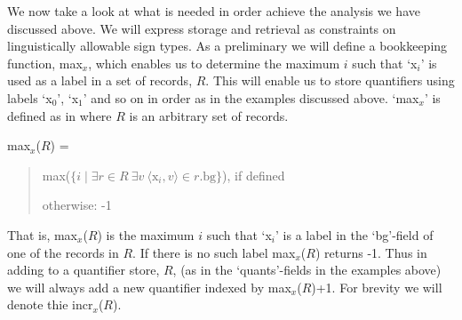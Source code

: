 We now take a look at what is needed in order achieve the analysis we
have discussed above.  We will express storage and retrieval as
constraints on linguistically allowable sign types.  As a preliminary
we will define a bookkeeping function, max$_x$, which enables us to determine
the maximum $i$ such that `x$_i$' is used as a label in a set of
records, $R$.  This will enable us to store quantifiers using labels
`x$_0$', `x$_1$' and so on in order as in the examples discussed
above. `max$_x$' is defined as in \nexteg{} where $R$ is an arbitrary
set of records.
\begin{ex} 
max$_x$($R$) = 
\begin{quote}
max($\{i\mid\exists r\in R\ \exists v\ \langle \mathrm{x}_i,v\rangle\in r.\mathrm{bg}\}$), if
defined

otherwise: -1 
\end{quote}
\end{ex}
That is, max$_x$($R$) is the maximum $i$ such that `x$_i$' is a label
in the `bg'-field of one of the records in $R$.  If there is no such label max$_x$($R$)
returns -1. Thus in adding to a quantifier store, $R$, (as in the
`quants'-fields in the examples above) we will always add a new
quantifier indexed by max$_x$($R$)+1.  For brevity we will denote thie
incr$_x$($R$). 

